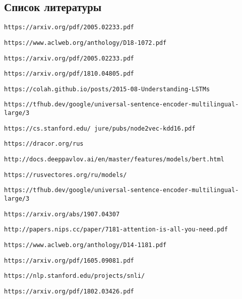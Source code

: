 \documentclass[a4paper,14pt]{article}
\begin{document}
\begin{center}
	\section*{Список литературы}
\end{center}
\begin{justify}

\begin{thebibliography}{9}

\texttt{https://arxiv.org/pdf/2005.02233.pdf}

\texttt{https://www.aclweb.org/anthology/D18-1072.pdf}

\texttt{https://arxiv.org/pdf/2005.02233.pdf}

\texttt{https://arxiv.org/pdf/1810.04805.pdf}

\texttt{https://colah.github.io/posts/2015-08-Understanding-LSTMs}

\texttt{https://tfhub.dev/google/universal-sentence-encoder-multilingual-large/3}

\texttt{https://cs.stanford.edu/~jure/pubs/node2vec-kdd16.pdf}

\texttt{https://dracor.org/rus}

\texttt{http://docs.deeppavlov.ai/en/master/features/models/bert.html}

\texttt{https://rusvectores.org/ru/models/}

\texttt{https://tfhub.dev/google/universal-sentence-encoder-multilingual-large/3}

\texttt{https://arxiv.org/abs/1907.04307}

\texttt{http://papers.nips.cc/paper/7181-attention-is-all-you-need.pdf}

\texttt{https://www.aclweb.org/anthology/D14-1181.pdf}

\texttt{https://arxiv.org/pdf/1605.09081.pdf}

\texttt{https://nlp.stanford.edu/projects/snli/}

\texttt{https://arxiv.org/pdf/1802.03426.pdf}

\end{thebibliography}
\end{justify}
\end{document}
